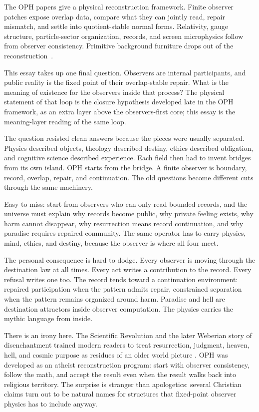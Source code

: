 \documentclass[11pt]{article}
\theoremstyle{remark}
\theoremstyle{plain}
\begin{document}
The OPH papers give a physical reconstruction framework. Finite observer
patches expose overlap data, compare what they can jointly read, repair
mismatch, and settle into quotient-stable normal forms. Relativity, gauge
structure, particle-sector organization, records, and screen microphysics
follow from observer consistency. Primitive background furniture drops out of
the reconstruction~\cite{OPHObservers,OPHEinstein,OPHGauge,OPHParticles,OPHConsensus,OPHMicro}.

This essay takes up one final question. Observers are internal participants,
and public reality is the fixed point of their overlap-stable repair. What is
the meaning of existence for the observers inside that process?
The physical statement of that loop is the closure hypothesis developed late
in the OPH framework, as an extra layer above the observers-first core; this
essay is the meaning-layer reading of the same loop.

The question resisted clean answers because the pieces were usually separated.
Physics described objects, theology described destiny, ethics described
obligation, and cognitive science described experience. Each field then had to
invent bridges from its own island. OPH starts from the bridge. A finite
observer is boundary, record, overlap, repair, and continuation. The old
questions become different cuts through the same machinery.

Easy to miss: start from observers who can only read bounded records, and the
universe must explain why records become public, why private feeling exists,
why harm cannot disappear, why resurrection means record continuation, and why
paradise requires repaired community. The same operator has to carry physics,
mind, ethics, and destiny, because the observer is where all four meet.

The personal consequence is hard to dodge. Every observer is moving through the
destination law at all times. Every act writes a contribution to the record.
Every refusal writes one too. The record tends toward a continuation
environment: repaired participation when the pattern admits repair, constrained
separation when the pattern remains organized around harm. Paradise and hell
are destination attractors inside observer computation. The physics carries the
mythic language from inside.

There is an irony here. The Scientific Revolution and the later Weberian story
of disenchantment trained modern readers to treat resurrection, judgment,
heaven, hell, and cosmic purpose as residues of an older world picture
\cite{Henry1997,Brooke1991,Weber1919}. OPH was developed as an atheist
reconstruction program: start with observer consistency, follow the math, and
accept the result even when the result walks back into religious territory. The
surprise is stranger than apologetics: several Christian claims turn out to be
natural names for structures that fixed-point observer physics has to include
anyway.
\end{document}
